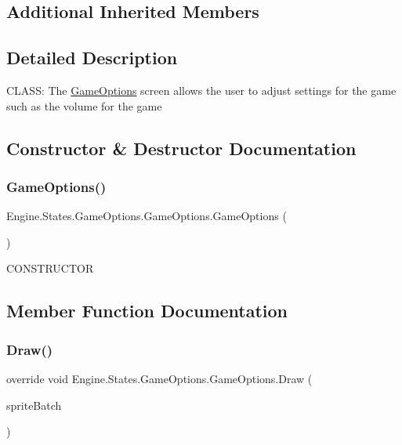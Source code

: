 \subsection*{Additional Inherited Members}


\subsection{Detailed Description}
C\+L\+A\+SS\+: The \hyperlink{a00558}{Game\+Options} screen allows the user to adjust settings for the game such as the volume for the game 



\subsection{Constructor \& Destructor Documentation}
\mbox{\label{a00558_aeea264989e80b36956d21eb8ecd53d07}} 
\subsubsection{\texorpdfstring{Game\+Options()}{GameOptions()}}
{\footnotesize\ttfamily Engine.\+States.\+Game\+Options.\+Game\+Options.\+Game\+Options (\begin{DoxyParamCaption}{ }\end{DoxyParamCaption})\hspace{0.3cm}{\ttfamily [inline]}}



C\+O\+N\+S\+T\+R\+U\+C\+T\+OR 



\subsection{Member Function Documentation}
\mbox{\label{a00558_a7668c0681e2f3bd52cb65b3abda014bd}} 
\subsubsection{\texorpdfstring{Draw()}{Draw()}}
{\footnotesize\ttfamily override void Engine.\+States.\+Game\+Options.\+Game\+Options.\+Draw (\begin{DoxyParamCaption}\item[{Microsoft.\+Xna.\+Framework.\+Graphics.\+Sprite\+Batch}]{sprite\+Batch }\end{DoxyParamCaption})\hspace{0.3cm}{\ttfamily [inline]}}



